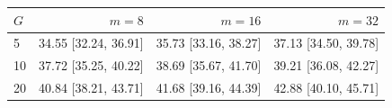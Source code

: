 \begin{tabular}{@{}lrrr@{}}
\toprule
$G$ & $m=8$ & $m=16$ & $m=32$ \\
\midrule
5 & 34.55 [32.24, 36.91] & 35.73 [33.16, 38.27] & 37.13 [34.50, 39.78] \\
10 & 37.72 [35.25, 40.22] & 38.69 [35.67, 41.70] & 39.21 [36.08, 42.27] \\
20 & 40.84 [38.21, 43.71] & 41.68 [39.16, 44.39] & 42.88 [40.10, 45.71] \\
\bottomrule
\end{tabular}
